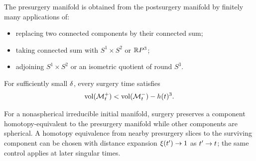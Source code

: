 \begin{lemma}
  \label{lem:kl-performing-surgery-continuing-flows-rigidity-ricci-flow-surgery}
 \label{reconstruct2}
The presurgery manifold is obtained from the postsurgery manifold by finitely
many applications of:
\begin{itemize}
\item replacing two connected components by their connected sum;
\item taking connected sum with $S^1\times S^2$ or ${\mathbb R} P^3$;
\item adjoining $S^1\times S^2$ or an isometric quotient of round $S^3$.
\end{itemize}
\end{lemma}

\begin{remark}
  \label{rem:kl-performing-surgery-continuing-flows-structural-remark-ricci-flow-surgery}
\label{volumelossremark}
For sufficiently small $\delta$, every surgery time satisfies
\[
\operatorname{vol}({\mathcal M}_t^+)<\operatorname{vol}({\mathcal M}_t^-)-h(t)^3.
\]
\end{remark}

\begin{remark}
  \label{rem:kl-performing-surgery-continuing-flows-existence-ricci-flow-surgery}
For a nonaspherical irreducible initial manifold, surgery preserves a
component homotopy-equivalent to the presurgery manifold while other
components are spherical. A homotopy equivalence from nearby presurgery
slices to the surviving component can be chosen with distance expansion
$\xi(t')\rightarrow1$ as $t'\rightarrow t$; the same control applies at later singular times.
\end{remark}

